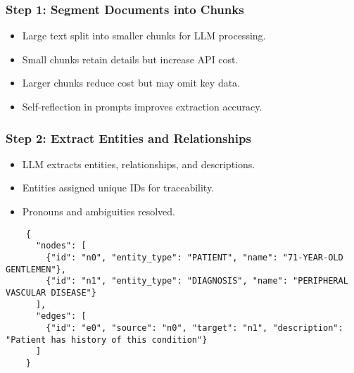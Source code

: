 \begin{frame}[fragile]\frametitle{Step 1: Segment Documents into Chunks}
    \begin{itemize}
        \item Large text split into smaller chunks for LLM processing.
        \item Small chunks retain details but increase API cost.
        \item Larger chunks reduce cost but may omit key data.
        \item Self-reflection in prompts improves extraction accuracy.
    \end{itemize}
\end{frame}

\begin{frame}[fragile]\frametitle{Step 2: Extract Entities and Relationships}
    \begin{itemize}
        \item LLM extracts entities, relationships, and descriptions.
        \item Entities assigned unique IDs for traceability.
        \item Pronouns and ambiguities resolved.
    \end{itemize}

    \begin{lstlisting}
    {
      "nodes": [
        {"id": "n0", "entity_type": "PATIENT", "name": "71-YEAR-OLD GENTLEMEN"},
        {"id": "n1", "entity_type": "DIAGNOSIS", "name": "PERIPHERAL VASCULAR DISEASE"}
      ],
      "edges": [
        {"id": "e0", "source": "n0", "target": "n1", "description": "Patient has history of this condition"}
      ]
    }
    \end{lstlisting}
\end{frame}

